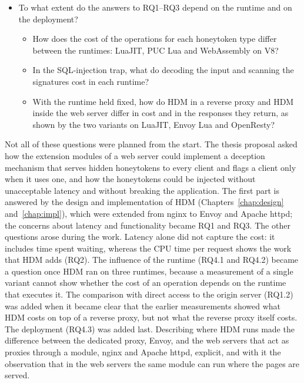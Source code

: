 \documentclass{rptuma}
\begin{document}
\begin{itemize}[leftmargin=3.2em,labelwidth=2.6em,labelsep=0.6em]
\begin{itemize}[leftmargin=3.4em,labelwidth=2.8em,labelsep=0.6em]
        without HDM?
    \end{itemize}
  \item[\textbf{RQ4}] To what extent do the answers to RQ1--RQ3 depend on the runtime and on the
    deployment?
    \begin{itemize}[leftmargin=3.4em,labelwidth=2.8em,labelsep=0.6em]
      \item[RQ4.1] How does the cost of the operations for each honeytoken type differ between the
        runtimes: LuaJIT, PUC Lua and WebAssembly on V8?
      \item[RQ4.2] In the SQL-injection trap, what do decoding the input and scanning the signatures
        cost in each runtime?
      \item[RQ4.3] With the runtime held fixed, how do HDM in a reverse proxy and HDM inside the web
        server differ in cost and in the responses they return, as shown by the two variants on
        LuaJIT, Envoy Lua and OpenResty?
    \end{itemize}
\end{itemize}

Not all of these questions were planned from the start. The thesis proposal asked how the extension
modules of a web server could implement a deception mechanism that serves hidden honeytokens to
every client and flags a client only when it uses one, and how the honeytokens could be injected
without unacceptable latency and without breaking the application. The first part is answered by
the design and implementation of HDM (Chapters~\ref{chap:design} and~\ref{chap:impl}), which were
extended from nginx to Envoy and Apache httpd; the concerns about latency and functionality became
RQ1 and RQ3. The other questions arose during the work. Latency alone did not capture the cost: it
includes time spent waiting, whereas the CPU time per request shows the work that HDM adds (RQ2).
The influence of the runtime (RQ4.1 and RQ4.2) became a question once HDM ran on three runtimes,
because a measurement of a single variant cannot show whether the cost of an operation depends on
the runtime that executes it. The comparison with direct access to the origin server
(RQ1.2) was added when it became clear that the earlier measurements showed what HDM costs on top of
a reverse proxy, but not what the reverse proxy itself costs. The deployment (RQ4.3) was added last.
Describing where HDM runs made the difference between the dedicated proxy, Envoy, and the web
servers that act as proxies through a module, nginx and Apache httpd, explicit, and with it the
observation that in the web servers the same module can run where the pages are served.
\end{document}
